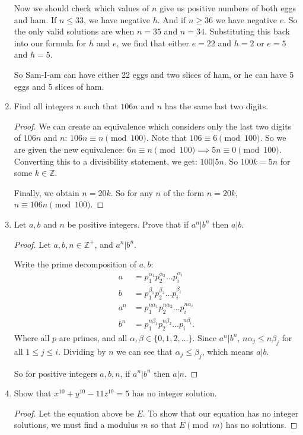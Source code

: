 \documentclass{article}
\begin{document}
\begin{enumerate}
Now we should check which values of $n$ give us positive numbers of both eggs and ham. 
If $n\le 33$, we have negative $h$. And if $n\ge 36$ we have 
negative $e$. So the only valid solutions are when $n=35$ and $n=34$. Substituting this back into our formula for $h$ and
$e$, we find that either $e=22$ and $h=2$ or $e=5$ and $h=5$.

So Sam-I-am can have either 22 eggs and two slices of ham, or he can have 5 eggs and 5 slices of ham.

\item Find all integers $n$ such that $106n$ and $n$ has the same last two digits.
\begin{proof} 
    We can create an equivalence which considers only the last two digits of $106n$ and $n$:
    $106n\equiv n\pmod{100}$. Note that $106\equiv 6\pmod{100}$. So we are given the new equivalence:
    $6n\equiv n\pmod{100}\implies5n\equiv 0\pmod{100}$. Converting this to a divisibility statement, we get:
    $100|5n$. So $100k=5n$ for some $k\in\mathbb{Z}$.

    Finally, we obtain $n=20k$. So for any $n$ of the form $n=20k$, $n\equiv 106n\pmod{100}$. 
\end{proof}
\newpage
\item Let $a, b$ and $n$ be positive integers. Prove that if $a^n|b^n$ then $a|b$.
\begin{proof} 
    Let $a,b,n\in \mathbb{Z}^{+}$, and $a^n|b^n$.

    Write the prime decomposition of $a,b$:
    \begin{align*}
        a&=p_1^{\alpha_1}p_2^{\alpha_2}\ldots p_i^{\alpha_i}\\
        b&=p_1^{\beta_1}p_2^{\beta_2}\ldots p_i^{\beta_i} \\ 
        a^{n}&=p_1^{n\alpha_1}p_2^{n\alpha_2}\ldots p_i^{n\alpha_i}\\
        b^{n}&=p_1^{n\beta_1}p_2^{n\beta_2}\ldots p_i^{n\beta_i}  
    .\end{align*}
    Where all $p$ are primes, and all $\alpha,\beta\in \{0,1,2,\ldots\} $. Since $a^{n}|b^{n}$,
    $n\alpha_j\le n\beta_j$ for all $1\le j\le i$. Dividing by $n$ we can see that $\alpha_j\le \beta_j$,
    which means $a|b$.
    
    So for positive integers $a,b,n$, if $a^{n}|b^{n}$ then $a|n$.

\end{proof}

\item Show that $x^{10} + y^{10} - 11z^{10} = 5$ has no integer solution.
\begin{proof} 
    Let the equation above be $E$.
    To show that our equation has no integer solutions, we must find a modulus $m$ so that $E\pmod{m}$ has 
    no solutions.


\end{proof}
\end{enumerate}
\end{document}
